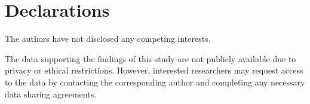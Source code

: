 \documentclass[conference]{IEEEtran}
\numberwithin{equation}{section}
\begin{document}
 \fi
 \section*{Declarations}
 The authors have not disclosed any competing interests.

The data supporting the findings of this study are not publicly available due to privacy or ethical restrictions. However, interested researchers may request access to the data by contacting the corresponding author and completing any necessary data sharing agreements.

\end{document}
